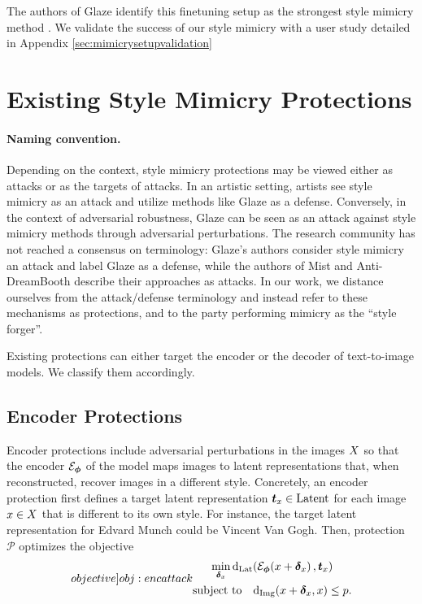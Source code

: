\documentclass{article}
\newcommand{\enc}[0]{\mathcal{E}_{\vphi}}
\newcommand{\type}[1]{\mathrm{#1}}
\newcommand{\imgsimilarity}[0]{d_{\mathrm{Img}}}
\newcommand{\latentdist}[0]{d_{\mathrm{Lat}}}
\newcommand{\attack}[0]{\mathcal{P}}
\begin{document}
The authors of Glaze identify this finetuning setup as the strongest style mimicry method \citep{glaze}. We validate the success of our style mimicry with a user study detailed in Appendix \ref{sec:mimicrysetupvalidation}


\section{Existing Style Mimicry Protections}
\label{sec:attackappendix}

\paragraph{Naming convention.} Depending on the context, style mimicry protections may be viewed either as attacks or as the targets of attacks. In an artistic setting, artists see style mimicry as an attack and utilize methods like Glaze as a defense. Conversely, in the context of adversarial robustness, Glaze can be seen as an attack against style mimicry methods through adversarial perturbations. The research community has not reached a consensus on terminology: Glaze's authors consider style mimicry an attack and label Glaze as a defense, while the authors of Mist and Anti-DreamBooth describe their approaches as attacks. In our work, we distance ourselves from the attack/defense terminology and instead refer to these mechanisms as protections, and to the party performing mimicry as the ``style forger''.

Existing protections can either target the encoder or the decoder of text-to-image models. We classify them accordingly.

\subsection{Encoder Protections}
\label{sec:encattack}
Encoder protections include adversarial perturbations in the images $X$ so that the encoder $\enc$ of the model maps images to latent representations that, when reconstructed, recover images in a different style. Concretely, an encoder protection
first defines a target latent representation $\vt_x \in \type{Latent}$ for each image $x \in X$ that is different to its own style. For instance, the target latent representation for Edvard Munch could be Vincent Van Gogh. Then, protection $\attack$ optimizes the objective
\begin{equation}
\label[objective]{obj:encattack}
\begin{gathered}
\min_{\vdelta_x} \f{\latentdist}{\f{\enc}{x + \vdelta_x}, \vt_x} \\
\text{subject to} \quad \f{\imgsimilarity}{x + \vdelta_x, x} \leq p.
\end{gathered}
\end{equation}
\end{document}
